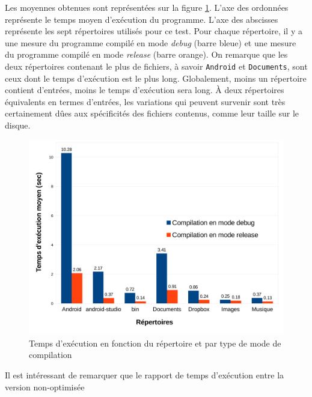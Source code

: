 \bigbreak
Les moyennes obtenues sont représentées sur la figure \ref{histo}. L'axe des ordonnées représente le temps 
moyen d'exécution du programme. L'axe des abscisses représente les sept répertoires utilisés pour ce test. 
Pour chaque répertoire, il y a une mesure du programme compilé en mode \textit{debug} (barre bleue) 
et une mesure du programme compilé en mode \textit{release} (barre orange). On remarque que les 
deux répertoires contenant le plus de fichiers, à savoir \texttt{Android} et 
\texttt{Documents}, sont ceux dont le temps d'exécution est le plus long. Globalement, 
moins un répertoire contient d'entrées, moins le temps d'exécution sera long. À deux répertoires 
équivalents en termes d'entrées, les variations qui peuvent survenir sont très certainement dûes 
aux spécificités des fichiers contenus, comme leur taille sur le disque.
\begin{figure}
    \begin{center}
        \includegraphics[width=1\textwidth]{images/histo.png}
    \end{center}
    \caption{Temps d'exécution en fonction du répertoire et par type de mode de compilation}
    \label{histo}
\end{figure}
Il est intéressant de remarquer que le rapport de temps d'exécution entre la version non-optimisée 

